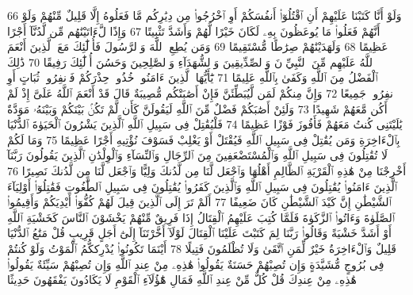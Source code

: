 {\tiny\colorbox{cl_aya}{66}} وَلَوْ أَنَّا كَتَبْنَا عَلَيْهِمْ أَنِ ٱقْتُلُوٓا۟ أَنفُسَكُمْ أَوِ ٱخْرُجُوا۟ مِن دِيَٰرِكُم مَّا فَعَلُوهُ إِلَّا قَلِيلٌ مِّنْهُمْ وَلَوْ أَنَّهُمْ فَعَلُوا۟ مَا يُوعَظُونَ بِهِۦ لَكَانَ خَيْرًا لَّهُمْ وَأَشَدَّ تَثْبِيتًا
{\tiny\colorbox{cl_aya}{67}} وَإِذًا لَّءَاتَيْنَٰهُم مِّن لَّدُنَّآ أَجْرًا عَظِيمًا
{\tiny\colorbox{cl_aya}{68}} وَلَهَدَيْنَٰهُمْ صِرَٰطًا مُّسْتَقِيمًا
{\tiny\colorbox{cl_aya}{69}} وَمَن يُطِعِ ٱللَّهَ وَٱلرَّسُولَ فَأُو۟لَٰٓئِكَ مَعَ ٱلَّذِينَ أَنْعَمَ ٱللَّهُ عَلَيْهِم مِّنَ ٱلنَّبِيِّۦنَ وَٱلصِّدِّيقِينَ وَٱلشُّهَدَآءِ وَٱلصَّٰلِحِينَ وَحَسُنَ أُو۟لَٰٓئِكَ رَفِيقًا
{\tiny\colorbox{cl_aya}{70}} ذَٰلِكَ ٱلْفَضْلُ مِنَ ٱللَّهِ وَكَفَىٰ بِٱللَّهِ عَلِيمًا
{\tiny\colorbox{cl_aya}{71}} يَٰٓأَيُّهَا ٱلَّذِينَ ءَامَنُوا۟ خُذُوا۟ حِذْرَكُمْ فَٱنفِرُوا۟ ثُبَاتٍ أَوِ ٱنفِرُوا۟ جَمِيعًا
{\tiny\colorbox{cl_aya}{72}} وَإِنَّ مِنكُمْ لَمَن لَّيُبَطِّئَنَّ فَإِنْ أَصَٰبَتْكُم مُّصِيبَةٌ قَالَ قَدْ أَنْعَمَ ٱللَّهُ عَلَىَّ إِذْ لَمْ أَكُن مَّعَهُمْ شَهِيدًا
{\tiny\colorbox{cl_aya}{73}} وَلَئِنْ أَصَٰبَكُمْ فَضْلٌ مِّنَ ٱللَّهِ لَيَقُولَنَّ كَأَن لَّمْ تَكُنۢ بَيْنَكُمْ وَبَيْنَهُۥ مَوَدَّةٌ يَٰلَيْتَنِى كُنتُ مَعَهُمْ فَأَفُوزَ فَوْزًا عَظِيمًا
{\tiny\colorbox{cl_aya}{74}} فَلْيُقَٰتِلْ فِى سَبِيلِ ٱللَّهِ ٱلَّذِينَ يَشْرُونَ ٱلْحَيَوٰةَ ٱلدُّنْيَا بِٱلْءَاخِرَةِ وَمَن يُقَٰتِلْ فِى سَبِيلِ ٱللَّهِ فَيُقْتَلْ أَوْ يَغْلِبْ فَسَوْفَ نُؤْتِيهِ أَجْرًا عَظِيمًا
{\tiny\colorbox{cl_aya}{75}} وَمَا لَكُمْ لَا تُقَٰتِلُونَ فِى سَبِيلِ ٱللَّهِ وَٱلْمُسْتَضْعَفِينَ مِنَ ٱلرِّجَالِ وَٱلنِّسَآءِ وَٱلْوِلْدَٰنِ ٱلَّذِينَ يَقُولُونَ رَبَّنَآ أَخْرِجْنَا مِنْ هَٰذِهِ ٱلْقَرْيَةِ ٱلظَّالِمِ أَهْلُهَا وَٱجْعَل لَّنَا مِن لَّدُنكَ وَلِيًّا وَٱجْعَل لَّنَا مِن لَّدُنكَ نَصِيرًا
{\tiny\colorbox{cl_aya}{76}} ٱلَّذِينَ ءَامَنُوا۟ يُقَٰتِلُونَ فِى سَبِيلِ ٱللَّهِ وَٱلَّذِينَ كَفَرُوا۟ يُقَٰتِلُونَ فِى سَبِيلِ ٱلطَّٰغُوتِ فَقَٰتِلُوٓا۟ أَوْلِيَآءَ ٱلشَّيْطَٰنِ إِنَّ كَيْدَ ٱلشَّيْطَٰنِ كَانَ ضَعِيفًا
{\tiny\colorbox{cl_aya}{77}} أَلَمْ تَرَ إِلَى ٱلَّذِينَ قِيلَ لَهُمْ كُفُّوٓا۟ أَيْدِيَكُمْ وَأَقِيمُوا۟ ٱلصَّلَوٰةَ وَءَاتُوا۟ ٱلزَّكَوٰةَ فَلَمَّا كُتِبَ عَلَيْهِمُ ٱلْقِتَالُ إِذَا فَرِيقٌ مِّنْهُمْ يَخْشَوْنَ ٱلنَّاسَ كَخَشْيَةِ ٱللَّهِ أَوْ أَشَدَّ خَشْيَةً وَقَالُوا۟ رَبَّنَا لِمَ كَتَبْتَ عَلَيْنَا ٱلْقِتَالَ لَوْلَآ أَخَّرْتَنَآ إِلَىٰٓ أَجَلٍ قَرِيبٍ قُلْ مَتَٰعُ ٱلدُّنْيَا قَلِيلٌ وَٱلْءَاخِرَةُ خَيْرٌ لِّمَنِ ٱتَّقَىٰ وَلَا تُظْلَمُونَ فَتِيلًا
{\tiny\colorbox{cl_aya}{78}} أَيْنَمَا تَكُونُوا۟ يُدْرِككُّمُ ٱلْمَوْتُ وَلَوْ كُنتُمْ فِى بُرُوجٍ مُّشَيَّدَةٍ وَإِن تُصِبْهُمْ حَسَنَةٌ يَقُولُوا۟ هَٰذِهِۦ مِنْ عِندِ ٱللَّهِ وَإِن تُصِبْهُمْ سَيِّئَةٌ يَقُولُوا۟ هَٰذِهِۦ مِنْ عِندِكَ قُلْ كُلٌّ مِّنْ عِندِ ٱللَّهِ فَمَالِ هَٰٓؤُلَآءِ ٱلْقَوْمِ لَا يَكَادُونَ يَفْقَهُونَ حَدِيثًا
